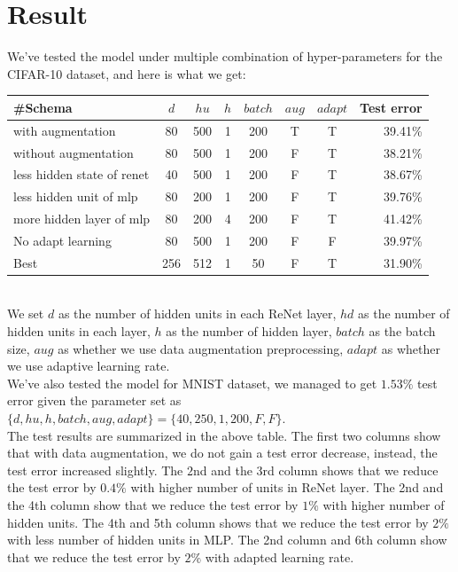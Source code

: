 \documentclass[final,leqno]{siamltex}
\begin{document}
\section{Result} \label{result}
We've tested the model under multiple combination of hyper-parameters for the CIFAR-10 dataset, and here is what we get:
\begin{center}
\end{center}
\begin{center}
\begin{tabular}{l c c c c c c r}
\hline
\#Schema & $d$ & $hu$ & $h$ & $batch$ & $aug$ & $adapt$ & Test error\\
\hline
with augmentation & 80 & 500 & 1 & 200 & T & T & 39.41\%\\
without augmentation & 80 & 500 & 1 & 200 & F & T & 38.21\%\\
less hidden state of renet & 40 & 500 & 1 & 200 & F & T & 38.67\%\\
less hidden unit of mlp & 80 & 200 & 1 & 200 & F & T & 39.76\%\\
more hidden layer of mlp & 80 & 200 & 4 & 200 & F & T & 41.42\%\\
No adapt learning & 80 & 500 & 1 & 200 & F & F & 39.97\%\\
Best & 256 & 512 &  1 & 50 & F & T & 31.90\%\\
\hline
\end{tabular}	
\end{center} 
~\\
We set $d$ as the number of hidden units in each ReNet layer, $hd$ as the number of hidden units in each layer, $h$ as the number of hidden layer, $batch$ as the batch size, $aug$ as whether we use data augmentation preprocessing, $adapt$ as whether we use adaptive learning rate.\\

We've also tested the model for MNIST dataset, we managed to get $1.53\%$ test error given the parameter set as $\{d, hu, h, batch, aug, adapt\}=\{40, 250, 1, 200, F, F\}$.\\

The test results are summarized in the above table. The first two columns show that with data augmentation, we do not gain a test error decrease, instead, the test error increased slightly. The $2$nd and the $3$rd column shows that we reduce the test error by $0.4\%$ with higher number of units in ReNet layer. The 2nd and the 4th column show that we reduce the test error by $1\%$ with higher number of hidden units. The 4th and 5th column shows that we reduce the test error by $2\%$ with less number of hidden units in MLP. The 2nd column and 6th column show that we reduce the test error by $2\%$ with adapted learning rate.\\
\end{document}
